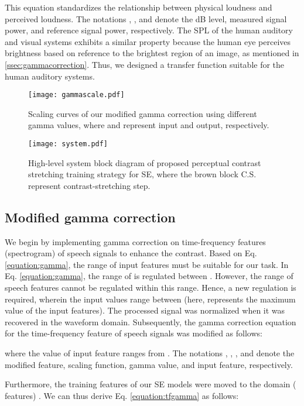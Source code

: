 \documentclass[a4paper]{article}
\begin{document}
This equation standardizes the relationship between physical loudness and perceived loudness. The notations , , and  denote the dB level, measured signal power, and reference signal power, respectively. The SPL of the human auditory and visual systems
exhibits a similar property because the human eye perceives brightness based on reference to the brightest region of an image, as mentioned in \ref{ssec:gammacorrection}. Thus, we designed a transfer function suitable for the human auditory systems.


\begin{figure}[h]
 \centering
 \texttt{[image: gammascale.pdf]}
 \caption{Scaling curves of our modified gamma correction using different gamma values, where  and  represent input and output, respectively.}  
 \label{fig:gammascale}
\end{figure}

\begin{figure*}[t]
 \centering
 \texttt{[image: system.pdf]}
 \caption{High-level system block diagram of proposed perceptual contrast stretching training strategy for SE, where the brown block C.S. represent contrast-stretching step.} 
 \label{fig:system}
 \vspace{-0.3cm}
\end{figure*}

\subsection{Modified gamma correction}
We begin by implementing gamma correction on time-frequency features (spectrogram) of speech signals to enhance the contrast.
Based on Eq. \ref{equation:gamma}, the range of input features must be suitable for our task. In Eq. \ref{equation:gamma}, the range of  is regulated between . However, the range of speech features cannot be regulated within this range. Hence, a new regulation is required, wherein the input values range between  (here,  represents the maximum value of the input features). The processed signal was normalized when it was recovered in the waveform domain. Subsequently, the gamma correction equation for the time-frequency feature of speech signals was modified as follows:

where the value of input feature  ranges from . The notations , , , and  denote the modified feature, scaling function, gamma value, and input feature, respectively.




Furthermore, the training features of our SE models were moved to the  domain ( features) \cite{fu2020boosting}. We can thus derive Eq. \ref{equation:tfgamma} as follows:
\end{document}
